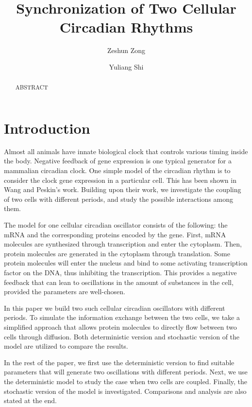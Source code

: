 \documentclass[12pt]{article}
\renewcommand{\(}{\left (}
\renewcommand{\)}{\right )}
\begin{document}
\title{Synchronization of Two Cellular Circadian Rhythms}
\date{}
\author[1]{Zeshun Zong}
\author[2]{Yuliang Shi}


\maketitle
\begin{abstract}
ABSTRACT
\end{abstract}

\section{Introduction}

\hspace{5mm} Almost all animals have innate biological clock that controls various timing inside the body. Negative feedback of gene expression is one typical generator for a mammalian circadian clock. One simple model of the circadian rhythm is to consider the clock gene expression in a particular cell. This has been shown in Wang and Peskin's work. Building upon their work, we investigate the coupling of two cells with different periods, and study the possible interactions among them.

The model for one cellular circadian oscillator consists of the following: the mRNA and the corresponding proteins encoded by the gene. First, mRNA molecules are synthesized through transcription and enter the cytoplasm. Then, protein molecules are generated in the cytoplasm through translation. Some protein molecules will enter the nucleus and bind to some activating transcription factor on the DNA, thus inhibiting the transcription. This provides a negative feedback that can lean to oscillations in the amount of substances in the cell, provided the parameters are well-chosen.

In this paper we build two such cellular circadian oscillators with different periods. To simulate the information exchange between the two cells, we take a simplified approach that allows protein molecules to directly flow between two cells through diffusion. Both deterministic version and stochastic version of the model are utilized to compare the results.

In the rest of the paper, we first use the deterministic version to find suitable parameters that will generate two oscillations with different periods. Next, we use the deterministic model to study the case when two cells are coupled. Finally, the stochastic version of the model is investigated. Comparisons and analysis are also stated at the end.
\end{document}

